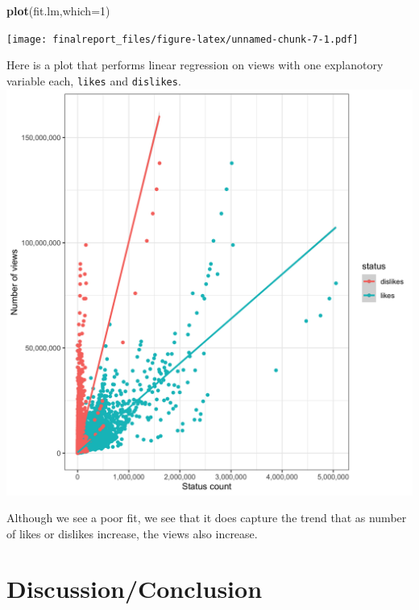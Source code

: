 \documentclass[]{article}
\newenvironment{Shaded}{\begin{snugshade}}{\end{snugshade}}
\newcommand{\DataTypeTok}[1]{\textcolor[rgb]{0.13,0.29,0.53}{#1}}
\newcommand{\DecValTok}[1]{\textcolor[rgb]{0.00,0.00,0.81}{#1}}
\newcommand{\KeywordTok}[1]{\textcolor[rgb]{0.13,0.29,0.53}{\textbf{#1}}}
\newcommand{\NormalTok}[1]{#1}
\begin{document}
\begin{Shaded}
\begin{Highlighting}[]
\KeywordTok{plot}\NormalTok{(fit.lm,}\DataTypeTok{which=}\DecValTok{1}\NormalTok{)}
\end{Highlighting}
\end{Shaded}

\texttt{[image: finalreport\_files/figure-latex/unnamed-chunk-7-1.pdf]}

Here is a plot that performs linear regression on views with one
explanotory variable each, \texttt{likes} and \texttt{dislikes}.
\includegraphics{../images/lm_status_views.png}

Although we see a poor fit, we see that it does capture the trend that
as number of likes or dislikes increase, the views also increase.

\hypertarget{discussionconclusion}{%
\section{Discussion/Conclusion}\label{discussionconclusion}}
\end{document}
